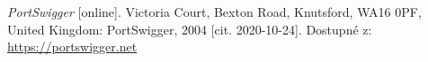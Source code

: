 \begin{thebibliography}{1}

\emph{PortSwigger} [online]. Victoria Court, Bexton Road, Knutsford, WA16 0PF, United Kingdom: PortSwigger, 2004 [cit. 2020-10-24]. Dostupné z: \url{https://portswigger.net}

\end{thebibliography}